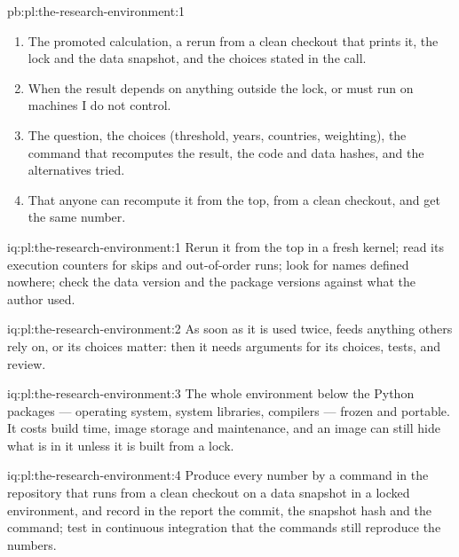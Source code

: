 \begin{solution}{pb:pl:the-research-environment:1}
\begin{enumerate}
promoted library reproduces from a clean directory with the data snapshot and environment lock checked.
\item The promoted calculation, a rerun from a clean checkout that prints it, the lock and the data snapshot, and the choices stated in the
call.
\item When the result depends on anything outside the lock, or must run on machines I do not control.
\item The question, the choices (threshold, years, countries, weighting), the command that recomputes the result, the code and data hashes, and
the alternatives tried.
\item That anyone can recompute it from the top, from a clean checkout, and get the same number.
\end{enumerate}
\end{solution}

\begin{solution}{iq:pl:the-research-environment:1}
Rerun it from the top in a fresh kernel; read its execution counters for skips and out-of-order runs; look for names defined nowhere; check the
data version and the package versions against what the author used.
\end{solution}

\begin{solution}{iq:pl:the-research-environment:2}
As soon as it is used twice, feeds anything others rely on, or its choices matter: then it needs arguments for its choices, tests, and review.
\end{solution}

\begin{solution}{iq:pl:the-research-environment:3}
The whole environment below the Python packages --- operating system, system libraries, compilers --- frozen and portable. It costs build time,
image storage and maintenance, and an image can still hide what is in it unless it is built from a lock.
\end{solution}

\begin{solution}{iq:pl:the-research-environment:4}
Produce every number by a command in the repository that runs from a clean checkout on a data snapshot in a locked environment, and record in the
report the commit, the snapshot hash and the command; test in continuous integration that the commands still reproduce the numbers.
\end{solution}

